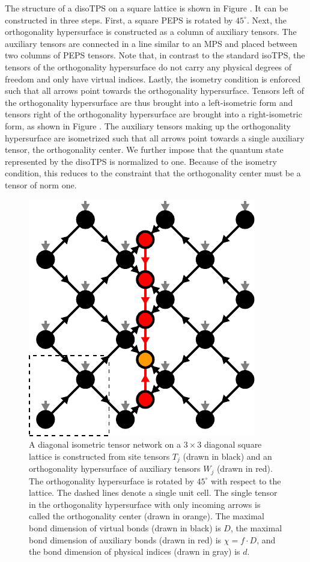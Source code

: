 The structure of a disoTPS on a square lattice is shown in Figure . It can be constructed in three steps. First, a square PEPS is rotated by $45^\circ$. Next, the orthogonality hypersurface is constructed as a column of auxiliary tensors. The auxiliary tensors are connected in a line similar to an MPS and placed between two columns of PEPS tensors. Note that, in contrast to the standard isoTPS, the tensors of the orthogonality hypersurface do not carry any physical degrees of freedom and only have virtual indices. Lastly, the isometry condition is enforced such that all arrows point towards the orthogonality hypersurface. Tensors left of the orthogonality hypersurface are thus brought into a left-isometric form and tensors right of the orthogonality hypersurface are brought into a right-isometric form, as shown in Figure . The auxiliary tensors making up the orthogonality hypersurface are isometrized such that all arrows point towards a single auxiliary tensor, the orthogonality center. We further impose that the quantum state represented by the disoTPS is normalized to one. Because of the isometry condition, this reduces to the constraint that the orthogonality center must be a tensor of norm one.\par
\begin{figure}[ht]
	\centering
	\includegraphics[scale=1]{figures/tikz/YB_isoTPS/YB_isoTPS_structure/YB_isoTPS_structure.pdf}
	\caption{A diagonal isometric tensor network on a $3\times3$ diagonal square lattice is constructed from site tensors $T_j$ (drawn in black) and an orthogonality hypersurface of auxiliary tensors $W_j$ (drawn in red). The orthogonality hypersurface is rotated by $45^\circ$ with respect to the lattice. The dashed lines denote a single unit cell. The single tensor in the orthogonality hypersurface with only incoming arrows is called the orthogonality center (drawn in orange). The maximal bond dimension of virtual bonds (drawn in black) is $D$, the maximal bond dimension of auxiliary bonds (drawn in red) is $\chi = f\cdot D$, and the bond dimension of physical indices (drawn in gray) is $d$.}
	\label{fig:YB_isoTPS_structure}
\end{figure}
